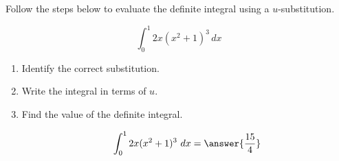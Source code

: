 \documentclass{ximera}
\begin{document}
\begin{problem}
Follow the steps below to evaluate the definite integral using a $u$-substitution.

\[ \int_{0}^{1} 2x(x^2 + 1)^3 \, dx \]


\begin{enumerate}
\item Identify the correct substitution.

\begin{multipleChoice}
\end{multipleChoice}


\item Write the integral in terms of $u.$

\begin{multipleChoice}
\end{multipleChoice}

\item Find the value of the definite integral.

\[ \int_{0}^{1} 2x(x^2 + 1)^3 \ dx = \answer{\frac{15}{4}} \]

\end{enumerate}
\end{problem}
\end{document}
